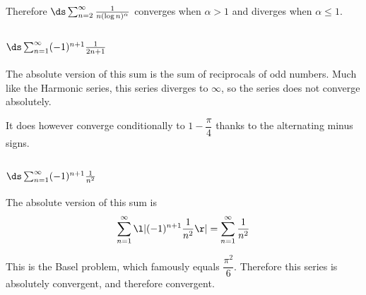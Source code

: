 \documentclass[a4paper]{article}
\begin{document}
Therefore $\ds\sum_{n=2}^\infty \frac1{n (\log n)^\alpha}$ converges when $\alpha > 1$ and diverges when $\alpha \le 1$.



\subsection{$\ds\sum_{n=1}^\infty (-1)^{n+1} \frac1{2n+1}$}

The absolute version of this sum is the sum of reciprocals of odd numbers. Much like the Harmonic series, this series diverges to $\infty$, so the series does not converge absolutely.

It does however converge conditionally to $1 - \dfrac\pi4$ thanks to the alternating minus signs.

\subsection{$\ds\sum_{n=1}^\infty (-1)^{n+1} \frac1{n^2}$}

The absolute version of this sum is $$\sum_{n=1}^\infty \l| (-1)^{n+1} \frac1{n^2} \r| = \sum_{n=1}^\infty \frac1{n^2}$$

This is the Basel problem, which famously equals $\dfrac{\pi^2}6$. Therefore this series is absolutely convergent, and therefore convergent.
\end{document}
